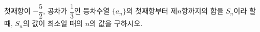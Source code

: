 첫째항이 $-\dfrac{5}{2}$, 공차가 $\dfrac{1}{3}$인 등차수열 $\{a_n\}$의 첫째항부터 제$n$항까지의 합을 $S_n$이라 할 때, $S_n$의 값이 최소일 때의 $n$의 값을 구하시오.
